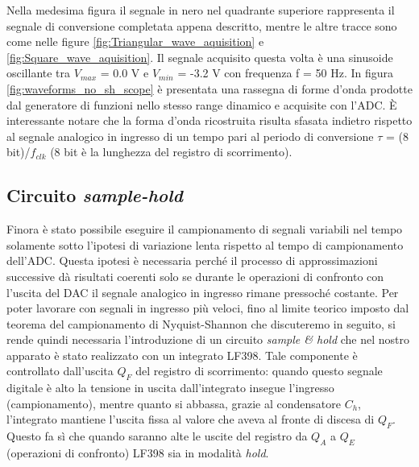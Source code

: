\documentclass[journal]{IEEEtran}
\begin{document}
\clearpage

Nella medesima figura il segnale in nero nel quadrante superiore rappresenta il segnale di conversione completata appena descritto, mentre le altre tracce sono come nelle figure \ref{fig:Triangular_wave_aquisition} e \ref{fig:Square_wave_aquisition}. Il segnale acquisito questa volta è una sinusoide oscillante tra $V_{max}$ = 0.0 V e $V_{min}$ = -3.2 V con frequenza f = 50 Hz. In figura \ref{fig:waveforms_no_sh_scope} è presentata una rassegna di forme d'onda prodotte dal generatore di funzioni nello stesso range dinamico e acquisite con l'ADC. È interessante notare che la forma d'onda ricostruita risulta sfasata indietro rispetto al segnale analogico in ingresso di un tempo pari al periodo di conversione $\tau$ = (8 bit)/$f_{clk}$ (8 bit è la lunghezza del registro di scorrimento). \\





\subsection{Circuito \textit{sample-hold}}
Finora è stato possibile eseguire il campionamento di segnali variabili nel tempo solamente sotto l'ipotesi di variazione lenta rispetto al tempo di campionamento dell'ADC. Questa ipotesi è necessaria perché il processo di approssimazioni successive dà risultati coerenti solo se durante le operazioni di confronto con l'uscita del DAC il segnale analogico in ingresso rimane pressoché costante. Per poter lavorare con segnali in ingresso più veloci, fino al limite teorico imposto dal teorema del campionamento di Nyquist-Shannon che discuteremo in seguito, si rende quindi necessaria l'introduzione di un circuito \textit{sample \& hold} che nel nostro apparato è stato realizzato con un integrato LF398. Tale componente è controllato dall'uscita $Q_F$ del registro di scorrimento: quando questo segnale digitale è alto la tensione in uscita dall'integrato insegue l'ingresso (campionamento), mentre quanto si abbassa, grazie al condensatore $C_h$, l'integrato mantiene l'uscita fissa al valore che aveva al fronte di discesa di $Q_F$. Questo fa sì che quando saranno alte le uscite del registro da $Q_A$ a $Q_E$ (operazioni di confronto) LF398 sia in modalità \textit{hold}.
\end{document}
